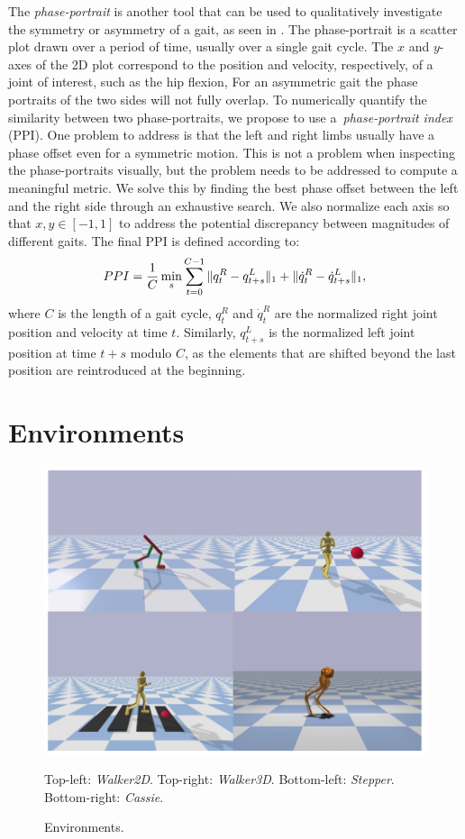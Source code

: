 The \textit{phase-portrait} is another tool that can be used to qualitatively investigate 
the symmetry or asymmetry of a gait, as seen in \cite{symmetry_phase_portrait}. 
The phase-portrait is a scatter plot drawn over a period of time, usually over a single gait cycle.
The $x$ and $y$-axes of the 2D plot correspond to the position and velocity, respectively, of a joint of interest, 
such as the hip flexion, 
For an asymmetric gait the phase portraits of the two sides will not fully overlap.
To numerically quantify the similarity between two phase-portraits, we propose to use a~\textit{phase-portrait index} (PPI).  
One problem to address is that the left and right limbs usually have a phase offset even for a symmetric motion.
This is not a problem when inspecting the phase-portraits visually, but the problem needs to be addressed to compute a 
meaningful metric.
We solve this by finding the best phase offset between the left and the right side through an exhaustive search. 
We also normalize each axis so that $x,y\in[-1,1]$ to address the potential discrepancy between magnitudes of different gaits.
The final PPI is defined according to:
\begin{align}
    PPI = \frac{1}{C} \min_s \sum_{t=0}^{C-1} \|q_t^R - q_{t+s}^L\|_1 + \|\dot{q}_t^R - \dot{q}_{t+s}^L\|_1,
\end{align}
where $C$ is the length of a gait cycle, $q_t^R$ and $\dot{q}_t^R$ are the normalized right joint 
position and velocity at time $t$. Similarly, $q_{t+s}^L$ is the normalized left joint position 
at time $t+s$ modulo $C$, as the elements that are shifted beyond the last position are reintroduced at the beginning.

\section{Environments}
\label{sec:environments}
\begin{figure}%
  \centering
  \includegraphics[width=0.9\columnwidth]{symmetry_figures/task_overview_2.png}
  \caption{Environments.}{Top-left: {\it Walker2D}. Top-right: {\it Walker3D}. Bottom-left: {\it Stepper}. Bottom-right: {\it Cassie}.}
  \label{fig:task-overview}
\end{figure}

